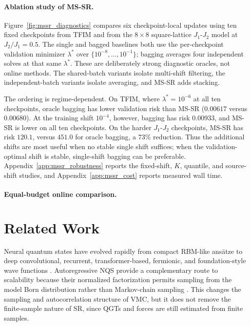 \documentclass{article}
\begin{document}
\paragraph{Ablation study of MS-SR.}
\label{par:mssr_ablations}

Figure~\ref{fig:mssr_diagnostics} compares six checkpoint-local updates using
ten fixed checkpoints from TFIM and from the $8\times8$ square-lattice
$J_1$-$J_2$ model at $J_2/J_1=0.5$. The single and bagged baselines both use
the per-checkpoint validation minimizer $\lambda^*$ over
$\{10^{-8},\ldots,10^{-1}\}$; bagging averages four independent solves at that
same $\lambda^*$. These are deliberately strong diagnostic oracles, not online
methods. The shared-batch variants isolate multi-shift filtering, the
independent-batch variants isolate averaging, and MS-SR adds stacking.

The ordering is regime-dependent. On TFIM, where $\lambda^*=10^{-6}$ at all
ten checkpoints, oracle bagging has lower validation risk than MS-SR
($0.00617$ versus $0.00680$). At the training shift $10^{-4}$, however, bagging
has risk $0.00933$, and MS-SR is lower on all ten checkpoints. On the harder
$J_1$-$J_2$ checkpoints, MS-SR has risk $120.1$, versus $451.0$ for oracle
bagging, a $73\%$ reduction. Thus the additional shifts are most useful when
no stable single shift suffices; when the validation-optimal shift is stable,
single-shift bagging can be preferable. Appendix~\ref{app:mssr_robustness}
reports the fixed-shift, $K$, quantile, and source-shift studies, and
Appendix~\ref{app:mssr_cost} reports measured wall time.

\paragraph{Equal-budget online comparison.}
\label{par:mssr_online}


\section{Related Work}

Neural quantum states have evolved rapidly from compact RBM-like ans\"atze to
deep convolutional, recurrent, transformer-based, fermionic, and
foundation-style wave functions
\citep{carleo2017solving, hibatallah2020rnn, pfau2020ferminet,
vonglehn2023psiformer, nomura2021dirac, rende2024simple,
nutakki2025design, rende2025foundation}. Autoregressive NQS provide a
complementary route to scalability because their normalized factorization
permits sampling from the model Born distribution rather than
Markov-chain sampling \citep{hibatallah2020rnn}. This changes the sampling and
autocorrelation structure of VMC, but it does not remove the finite-sample
nature of SR, since QGTs and forces are still estimated from finite samples.
\end{document}
